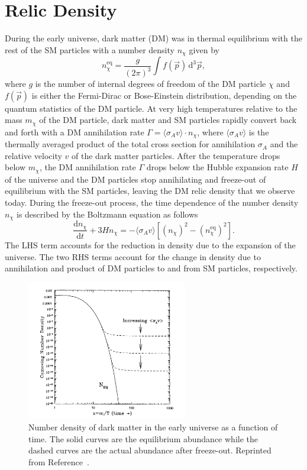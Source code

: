 \section{Relic Density}
\label{sec:dm_relic}

During the early universe, dark matter (DM) was in thermal equilibrium with the rest of the SM particles with a number density $n_\chi$ given by
\begin{equation}
  n_\chi^{\text{eq}} = \frac{g}{(2\pi)^3} \int f(\vec p) \, \text{d}^3 \vec p,
\end{equation}
where $g$ is the number of internal degrees of freedom of the DM particle $\chi$ and $f(\vec p)$ is either the Fermi-Dirac or Bose-Einstein distribution, depending on the quantum statistics of the DM particle.
At very high temperatures relative to the mass $m_\chi$ of the DM particle, dark matter and SM particles rapidly convert back and forth with a DM annihilation rate $\Gamma = \langle \sigma_A v \rangle \cdot n_\chi$, where $\langle \sigma_A v \rangle$ is the thermally averaged product of the total cross section for annihilation $\sigma_A$ and the relative velocity $v$ of the dark matter particles.
After the temperature drops below $m_\chi$, the DM annihilation rate $\Gamma$ drops below the Hubble expansion rate $H$ of the universe and the DM particles stop annihilating and freeze-out of equilibrium with the SM particles, leaving the DM relic density that we observe today.
During the freeze-out process, the time dependence of the number density $n_\chi$ is described by the Boltzmann equation as follows
\begin{equation}
  \frac{\text{d} n_\chi}{\text{d}t} + 3 H n_\chi = - \langle \sigma_A v \rangle \left[ (n_\chi)^2 - (n_\chi^{\text{eq}})^2\right].
\end{equation}
The LHS term accounts for the reduction in density due to the expansion of the universe.
The two RHS terms account for the change in density due to annihilation and product of DM particles to and from SM particles, respectively.

\begin{figure}[htbp]
  \centering
  \includegraphics[width=0.625\textwidth]{DarkMatter/Figures/relic_density.png}
  \caption{
    Number density of dark matter in the early universe as a function of time.
    The solid curves are the equilibrium abundance while the dashed curves are the actual abundance after freeze-out.
    Reprinted from Reference~\cite{}. %
  }
  \label{fig:relic_density}
\end{figure}

